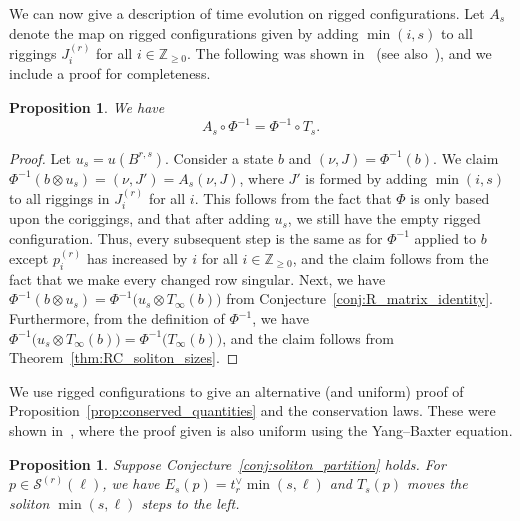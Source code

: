 \documentclass[reqno]{amsart}
\newcommand{\Sol}{\mathcal{S}} %
\newcommand{\ZZ}{\mathbb{Z}}
\theoremstyle{plain}
\newtheorem{prop}[thm]{Proposition}
\theoremstyle{definition}
\numberwithin{equation}{section}
\begin{document}
We can now give a description of time evolution on rigged configurations.
Let $A_s$ denote the map on rigged configurations given by adding $\min(i, s)$ to all riggings $J_i^{(r)}$ for all $i \in \ZZ_{\geq 0}$.
The following was shown in~\cite[Prop.~2.6]{KOSTY06} (see also~\cite[Thm.~5.2]{KSY11}), and we include a proof for completeness.

\begin{prop}
\label{prop:top_commutes}
We have
\[
A_s \circ \Phi^{-1} = \Phi^{-1} \circ T_s.
\]
\end{prop}

\begin{proof}
Let $u_s = u(B^{r,s})$.
Consider a state $b$ and $(\nu, J) = \Phi^{-1}(b)$.
We claim $\Phi^{-1}(b \otimes u_s) = (\nu, J') = A_s(\nu, J)$, where $J'$ is formed by adding $\min(i, s)$ to all riggings in $J_i^{(r)}$ for all $i$.
This follows from the fact that $\Phi$ is only based upon the coriggings, and that after adding $u_s$, we still have the empty rigged configuration.
Thus, every subsequent step is the same as for $\Phi^{-1}$ applied to $b$ except $p_i^{(r)}$ has increased by $i$ for all $i \in \ZZ_{\geq 0}$, and the claim follows from the fact that we make every changed row singular.
Next, we have  $\Phi^{-1}(b \otimes u_s) = \Phi^{-1}\bigl(u_s \otimes T_{\infty}(b)\bigr)$ from Conjecture~\ref{conj:R_matrix_identity}.
Furthermore, from the definition of $\Phi^{-1}$, we have $\Phi^{-1}\bigl(u_s \otimes T_{\infty}(b)\bigr) = \Phi^{-1}\bigl(T_{\infty}(b)\bigr)$, and the claim follows from Theorem~\ref{thm:RC_soliton_sizes}.
\end{proof}

We use rigged configurations to give an alternative (and uniform) proof of Proposition~\ref{prop:conserved_quantities} and the conservation laws.
These were shown in~\cite[Thm.~3.2]{FOY00}, where the proof given is also uniform using the Yang--Baxter equation.

\begin{prop}
\label{prop:state_movement}
Suppose Conjecture~\ref{conj:soliton_partition} holds.
For $p \in \Sol^{(r)}(\ell)$, we have $E_s(p) = t_r^{\vee} \min(s, \ell)$ and $T_s(p)$ moves the soliton $\min(s, \ell)$ steps to the left.
\end{prop}
\end{document}
